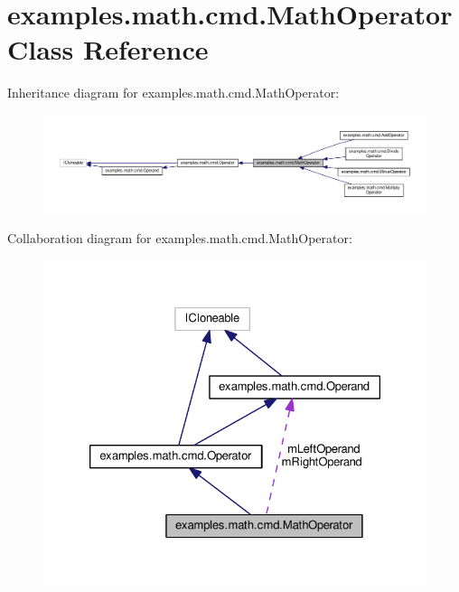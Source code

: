 \hypertarget{classexamples_1_1math_1_1cmd_1_1_math_operator}{\section{examples.\-math.\-cmd.\-Math\-Operator Class Reference}
\label{classexamples_1_1math_1_1cmd_1_1_math_operator}
}


Inheritance diagram for examples.\-math.\-cmd.\-Math\-Operator\-:
\nopagebreak
\begin{figure}[H]
\begin{center}
\leavevmode
\includegraphics[width=350pt]{classexamples_1_1math_1_1cmd_1_1_math_operator__inherit__graph}
\end{center}
\end{figure}


Collaboration diagram for examples.\-math.\-cmd.\-Math\-Operator\-:
\nopagebreak
\begin{figure}[H]
\begin{center}
\leavevmode
\includegraphics[width=326pt]{classexamples_1_1math_1_1cmd_1_1_math_operator__coll__graph}
\end{center}
\end{figure}
